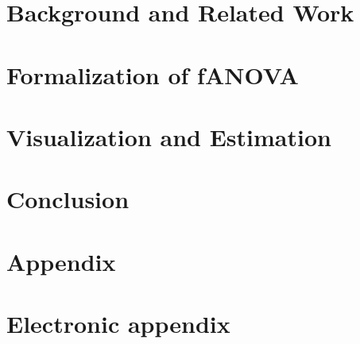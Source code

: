 \documentclass[12pt]{article}
\begin{document}
\section{Background and Related Work}\label{sec:related_work}


\newpage
\section{Formalization of fANOVA}\label{sec:formalization_fANOVA}


\newpage


\newpage
\section{Visualization and Estimation}\label{sec:examples}

\newpage

\section{Conclusion}\label{sec:conclusion}


\RaggedRight


\newpage


    

\setcounter{page}{5} %

\appendix

\section{Appendix}
\label{app}

\newpage

\section{Electronic appendix}
\label{el_app}
\end{document}
